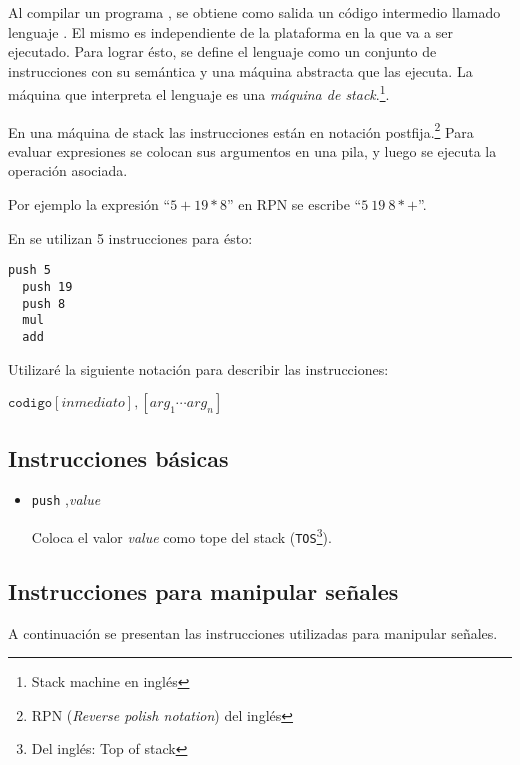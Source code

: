   Al compilar un programa \frob{}, se obtiene como salida un código
intermedio llamado lenguaje \alf{}.
  El mismo es independiente de la plataforma en la que va a ser ejecutado.
  Para lograr ésto, se define el lenguaje como un conjunto de instrucciones
con su semántica y una máquina abstracta que las ejecuta.
La máquina que interpreta el lenguaje \alf{} es una
\textit{máquina de stack}.\footnote{Stack machine en inglés}.

  En una máquina de stack las instrucciones están en notación
  postfija.\footnote{RPN (\textit{Reverse polish notation}) del inglés}
  Para evaluar expresiones se colocan sus argumentos en una pila, y luego
se ejecuta la operación asociada.
  
  Por ejemplo la expresión ``$5 + 19 * 8$'' en RPN se
  escribe ``$5\ 19\ 8 * +$''.
  
  En \alf{} se utilizan 5 instrucciones para ésto:

  \begin{Verbatim}[frame=single]
  push 5
  push 19
  push 8
  mul
  add
  \end{Verbatim}
  
  Utilizaré la siguiente notación para describir las instrucciones:
  \begin{center}
    $\texttt{codigo}  [\textit{inmediato}],  [ {arg}_1 \dotsb {arg}_n ]$
  \end{center}

\subsection{Instrucciones básicas}

\begin{itemize}

\item {
    \texttt{push} ,\textit{value}

    Coloca el valor \textit{value} como tope del stack (\texttt{TOS}\footnote{Del inglés: Top
    of stack}).

    
}

\end{itemize}

\subsection{Instrucciones para manipular señales}
  
  A continuación se presentan las instrucciones utilizadas para manipular
señales.

